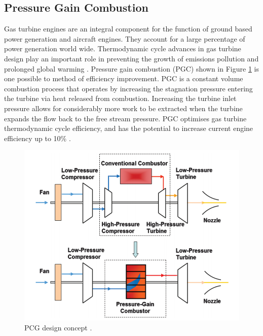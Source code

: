 \subsection{Pressure Gain Combustion}
Gas turbine engines are an integral component for the function of ground based power generation and aircraft engines. They account for a large percentage of power generation world wide. Thermodynamic cycle advances in gas turbine design play an important role in preventing the growth of emissions pollution and prolonged global warming \citep{paxson2018pressure}. Pressure gain combustion (PGC) shown in Figure \ref{fig:pcg} is one possible to method of efficiency improvement. PGC is a constant volume combustion process that operates by increasing the stagnation pressure entering the turbine via heat released from combustion. Increasing the turbine inlet pressure allows for considerably more work to be extracted when the turbine expands the flow back to the free stream pressure. PGC optimises gas turbine thermodynamic cycle efficiency, and has the potential to increase current engine efficiency up to 10\% \citep{gulen2013constant}.

\begin{figure}[H] 
 \centering
 \includegraphics[scale=0.5]{pcg.png} 
 \caption{PCG design concept \citep{akbari2009review}.}
 \label{fig:pcg}
\end{figure}

